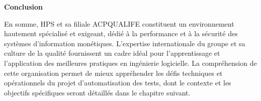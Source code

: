 \vspace{10pt}
\textbf{Conclusion}

En somme, HPS et sa filiale ACPQUALIFE constituent un environnement hautement spécialisé et exigeant, dédié à la performance et à la sécurité des systèmes d'information monétiques. L'expertise internationale du groupe et sa culture de la qualité fournissent un cadre idéal pour l'apprentissage et l'application des meilleures pratiques en ingénierie logicielle. La compréhension de cette organisation permet de mieux appréhender les défis techniques et opérationnels du projet d'automatisation des tests, dont le contexte et les objectifs spécifiques seront détaillés dans le chapitre suivant.
